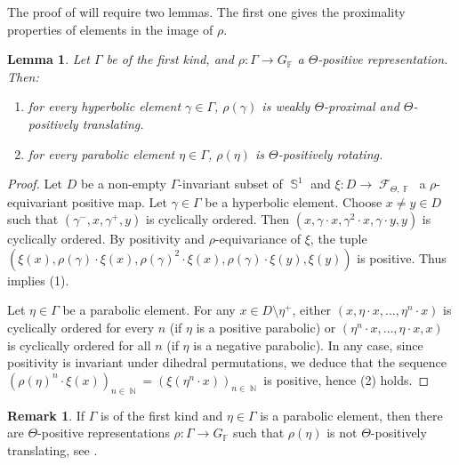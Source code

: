 \documentclass{amsart}
\theoremstyle{plain}
\newtheorem{lemma}[proposition]{Lemma}
\theoremstyle{definition}
\newtheorem{remark}[proposition]{Remark}
\DeclareMathOperator{\Fc}{\mathcal{F}}
\DeclareMathOperator{\Fb}{{\mathbb{F}}}
\DeclareMathOperator{\Nb}{{\mathbb{N}}}
\DeclareMathOperator{\Sb}{\mathbb{S}}
\newcommand*\from{\colon}
\newcommand{\1}{\mathbf{1}}
\begin{document}
The proof of  will require two lemmas. The first one gives the proximality properties of elements in the image of $\rho$.

\begin{lemma}\label{propo: positive implies weak proximal}
    Let $\Gamma$ be of the first kind, and $\rho \from \Gamma \to G_{\Fb}$ a $\Theta$-positive representation. Then:
        \begin{enumerate}
        \item for every hyperbolic element $\gamma \in \Gamma$, $\rho(\gamma)$ is weakly $\Theta$-proximal and $\Theta$-positively translating.
        \item for every parabolic element $\eta \in \Gamma$, $\rho(\eta)$ is $\Theta$-positively rotating.
        \end{enumerate}
\end{lemma}


\begin{proof}
    Let $D$ be a non-empty $\Gamma$-invariant subset of $\Sb^1$ and $\xi \colon D \to \Fc_{\Theta,\Fb}$ a $\rho$-equivariant positive map.
    Let $\gamma \in \Gamma$ be a hyperbolic element.
    Choose $x \neq y \in D$ such that $(\gamma^-,x,\gamma^+,y)$ is cyclically ordered. Then $(x, \gamma \cdot x, \gamma^2 \cdot x, \gamma \cdot y, y)$ is cyclically ordered.
    By positivity and $\rho$-equivariance of $\xi$, the tuple 
    $(\xi(x), \rho(\gamma) \cdot \xi(x), \rho(\gamma)^2 \cdot \xi(x), \rho(\gamma) \cdot \xi(y), \xi(y))$ is positive.
    Thus  implies (1).

    Let $\eta \in \Gamma$ be a parabolic element. For any $x \in D\setminus \eta^+$, either $(x, \eta\cdot x, \ldots, \eta^n\cdot x)$ is cyclically ordered for every $n$ (if $\eta$ is a positive parabolic) or $(\eta^n\cdot x, \ldots , \eta\cdot x, x)$ is cyclically ordered for all $n$ (if $\eta$ is a negative parabolic). In any case, since positivity is invariant under dihedral permutations, we deduce that the sequence $(\rho(\eta)^n \cdot \xi(x))_{n \in \Nb} = (\xi(\eta^n\cdot x))_{n\in \Nb}$ is positive, hence (2) holds. 
\end{proof}

\begin{remark}
If $\Gamma$ is of the first kind and $\eta\in\Gamma$ is a parabolic element, then there are $\Theta$-positive representations $\rho\colon\Gamma\to G_{\Fb}$ such that $\rho(\eta)$ is not $\Theta$-positively translating, see . 
\end{remark}
\end{document}
